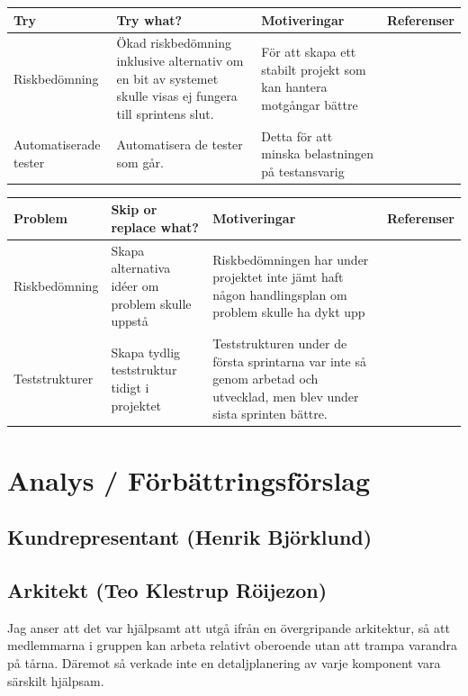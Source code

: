 \documentclass[conference,a4paper]{IEEEtran}
\newcommand\Tstrut{\rule{0pt}{2.6ex}}       %
\newcommand\Bstrut{\rule[-0.9ex]{0pt}{0pt}} %
\newcommand{\TBstrut}{\Tstrut\Bstrut} %
\begin{document}
\begin{table}[H]
	\small
  \centering
	\begin{tabular}{|p{1.9cm}|p{2cm}|p{1.7cm}|p{1.2cm}|} %
    \hline
    Try & Try what? & Motiveringar & Referenser \TBstrut \\
    \hline
    Riskbedömning & Ökad riskbedömning inklusive alternativ om en bit av systemet skulle visas ej fungera till sprintens slut. & För att skapa ett stabilt projekt som kan hantera motgångar bättre& \TBstrut \\
    \hline
    Automatiserade tester & Automatisera de tester som går. & Detta för att minska belastningen på testansvarig& \TBstrut \\
    \hline

  \end{tabular}
\end{table}

\begin{table}[H]
	\small
  \centering
	\begin{tabular}{|p{1.9cm}|p{1.7cm}|p{2.2cm}|p{1.2cm}|} %
    \hline
    Problem & Skip or replace what? & Motiveringar & Referenser \TBstrut \\
    \hline
    Riskbedömning & Skapa alternativa idéer om problem skulle uppstå &  Riskbedömningen har under projektet inte jämt haft någon handlingsplan om problem skulle ha dykt upp& \TBstrut \\
    \hline
    Teststrukturer &Skapa tydlig teststruktur tidigt i projektet &Teststrukturen under de första sprintarna var inte så genom arbetad och utvecklad, men blev under sista sprinten bättre.  & \TBstrut \\
    \hline

  \end{tabular}
\end{table}

\section{Analys / Förbättringsförslag} \label{sec:analys}

\subsection{Kundrepresentant (Henrik Björklund)}

\subsection{Arkitekt (Teo Klestrup Röijezon)}
Jag anser att det var hjälpsamt att utgå ifrån en övergripande arkitektur, så att medlemmarna i gruppen kan arbeta relativt oberoende utan att trampa varandra på tårna. Däremot så verkade inte en detaljplanering av varje komponent vara särskilt hjälpsam.
\end{document}

